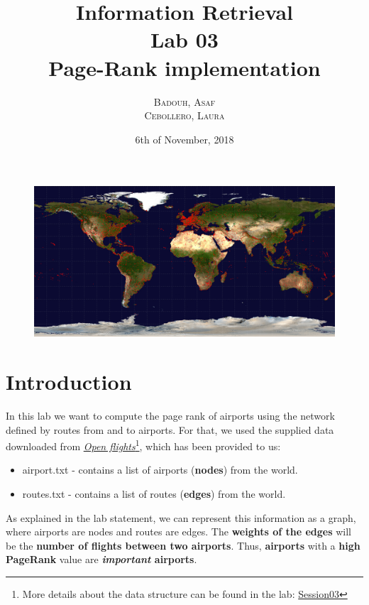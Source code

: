 \documentclass[10pt, a4paper]{article}
\title{ \Large  Information Retrieval \\ Lab 03 \\ \huge \textbf{Page-Rank implementation}}
\author{\textsc{Badouh, Asaf} \\ \textsc{Cebollero, Laura }}
\date{6th of November, 2018}
\begin{document}

\maketitle
\begin{figure}[b!]
    \centering
    \includegraphics[width=\linewidth]{openflights-apdb-2048.png}
\end{figure}


\newpage


\section{Introduction}
In this lab we want to compute the page rank of airports using the network defined by routes from and to airports. For that, we used the supplied data downloaded from  \href{https://openflights.org/data.html}{\textit{Open flights}}\footnote{More details about the data structure can be found in the lab:  \href{http://www.cs.upc.edu/~ir-miri/labs/session3.zip}{Session03}}, which has been provided to us:
\begin{itemize}
    \itemsep-0.5em 
    \item {\selectfont airport.txt} - contains a list of airports (\textbf{nodes}) from the world.
    \item {\selectfont routes.txt} - contains a list of routes (\textbf{edges}) from the world.
\end{itemize}
As explained in the lab statement, we can represent this information as a graph, where airports are nodes and routes are edges. The \textbf{weights of the edges }will be the \textbf{number of flights between two airports}. Thus, \textbf{airports} with a \textbf{high PageRank} value are \textbf{\textit{important} airports}. 
\end{document}
